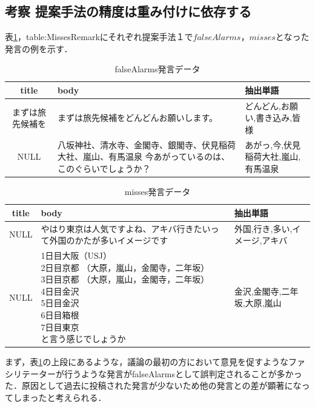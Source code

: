 \subsection*{考察 提案手法の精度は重み付けに依存する}
表\ref{table:FalseAlarmsRemark}，{table:MissesRemark}にそれぞれ提案手法１で$falseAlarms$，$misses$となった発言の例を示す．
\begin{table}[htbp]
  \begin{tabular}{| c |  p{6cm} | p{5cm} |} \hline
     title & body  & 抽出単語 \\ \hline
     まずは旅先候補を&まずは旅先候補をどんどんお願いします。&どんどん,お願い,書き込み,皆様\\ \hline
     NULL &八坂神社、清水寺、金閣寺、銀閣寺、伏見稲荷大社、嵐山、有馬温泉 今あがっているのは、このぐらいでしょうか？&あがっ,今,伏見稲荷大社,嵐山,有馬温泉\\
     \hline
  \end{tabular}
  \caption{falseAlarms発言データ} \label{table:FalseAlarmsRemark}
\end{table}
\begin{table}[htbp]
\begin{center}
  \begin{tabular}{| c | p{8cm} | p{6cm} |} \hline
     title & body & 抽出単語 \\ \hline
     NULL&やはり東京は人気ですよね、アキバ行きたいって外国のかたが多いイメージです & 外国,行き,多い,イメージ,アキバ \\ \hline
     NULL &  \shortstack{1日目大阪（USJ）\\
 2日目京都 （大原，嵐山，金閣寺，二年坂）\\
 3日目京都 （大原，嵐山，金閣寺，二年坂）\\
 4日目金沢\\
 5日目金沢\\
 6日目箱根\\
 7日目東京\\
 と言う感じでしょうか} & 金沢,金閣寺,二年坂,大原,嵐山\\
     \hline
  \end{tabular}
  \caption{misses発言データ} \label{table:MissesRemark}
  \end{center}
\end{table}
まず，表\ref{table:FalseAlarmsRemark}の上段にあるような，議論の最初の方において意見を促すようなファシリテーターが行うような発言がfalseAlarmsとして誤判定されることが多かった．原因として過去に投稿された発言が少ないため他の発言との差が顕著になってしまったと考えられる．
